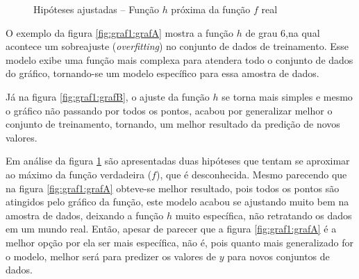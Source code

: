  \begin{figure}[h!]
    \centering
    \quad
    
    \caption{Hipóteses ajustadas – Função ${h}$ próxima da função ${f}$ real} \label{fig:graf1}
        
\end{figure}


O exemplo da figura \ref{fig:graf1:grafA} mostra a função ${h}$  de grau 6,na qual acontece um sobreajuste (\textit{overfitting}) no conjunto de dados de treinamento. Esse modelo exibe uma função mais complexa para atendera todo o conjunto de dados do gráfico, tornando-se um modelo específico para essa amostra de dados. 

Já na figura \ref{fig:graf1:grafB}, o ajuste da função ${h}$ se torna mais simples e mesmo o gráfico não passando por todos os pontos, acabou por generalizar melhor o conjunto de treinamento, tornando, um melhor resultado da predição de novos valores. 

Em análise da figura \ref{fig:graf1} são apresentadas duas hipóteses que tentam se aproximar ao máximo da função verdadeira (${f}$), que é desconhecida. Mesmo parecendo que na figura \ref{fig:graf1:grafA} obteve-se melhor resultado, pois todos os pontos são atingidos pelo gráfico da função, este modelo acabou se ajustando muito bem na amostra de dados, deixando a função ${h}$ muito específica, não retratando os dados em um mundo real. Então, apesar de parecer que a figura \ref{fig:graf1:grafA} é  a melhor opção por ela ser mais específica, não é, pois quanto mais generalizado for o modelo, melhor será para predizer os valores de ${y}$ para novos conjuntos de dados.


